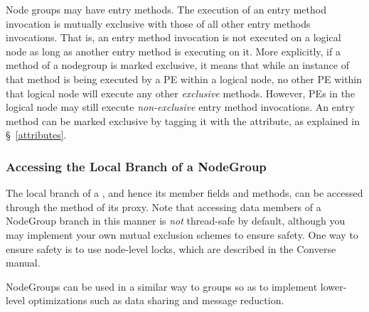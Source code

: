 Node groups may have  entry methods.  The execution of an 
entry method invocation is mutually exclusive with those of all other  entry methods invocations.
That is, an 
entry method invocation is not executed on a logical node as long as another  entry 
method is executing on it.
More explicitly, if a method  of a
nodegroup  is marked exclusive, it means that while an instance of that method is being
executed by a PE within a logical node, no other PE within that
logical node will execute any other {\em exclusive} methods.
However, PEs in the logical node may still 
execute {\em non-exclusive} entry method invocations.
An entry method can be marked exclusive by tagging it with the  attribute,
as explained in \S~\ref{attributes}.


\subsubsection{Accessing the Local Branch of a NodeGroup}

The local branch of a  , and hence its
member fields and methods, can be accessed through the method  of its proxy. Note that accessing data members of
a NodeGroup branch in this manner is {\em not} thread-safe by default, although
you may implement your own mutual exclusion schemes to ensure safety.
One way to ensure safety is to use node-level locks, which are described in the
Converse manual.

NodeGroups can be used in a similar way to groups so as to implement lower-level
optimizations such as data sharing and message reduction.


